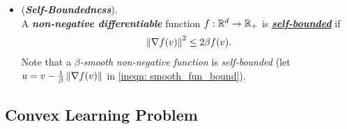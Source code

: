 \documentclass[11pt]{article}
\begin{document}
\begin{itemize}
\item \begin{definition} (\emph{\textbf{Self-Boundedness}}). \\
A \emph{\textbf{non-negative differentiable}} function $f : {\mathbb R}^d \to {\mathbb R}_{+}$ is \underline{\emph{\textbf{self-bounded}}} if 
\begin{align*}
\left\|\nabla f(v)\right\|_{}^2 \le 2 \beta f(v).
\end{align*} Note that a \emph{$\beta$-smooth} \emph{non-negative function} is \emph{self-bounded} (let $u= v - \frac{1}{\beta}\left\|\nabla f(v)\right\|_{}$ in \eqref{ineqn: smooth_fun_bound}).
\end{definition}
\end{itemize}
\subsection{Convex Learning Problem}
\end{document}

